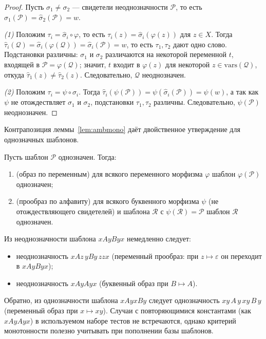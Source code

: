 \documentclass[14pt, russian]{scrartcl}
\begin{document}
\begin{proof}
Пусть $\sigma_1 \neq \sigma_2$ --- свидетели неоднозначности $\mathcal{P}$, то есть
$\hat\sigma_1(\mathcal{P}) = \hat\sigma_2(\mathcal{P}) = w$.

\textit{(1)} Положим $\tau_i = \hat\sigma_i \circ \varphi$, то есть
$\tau_i(z) = \hat\sigma_i(\varphi(z))$ для $z \in X$. Тогда
$\hat\tau_i(\mathcal{Q}) = \hat\sigma_i(\varphi(\mathcal{Q})) =
\hat\sigma_i(\mathcal{P}) = w$, то есть $\tau_1, \tau_2$ дают одно слово.
Подстановки различны: $\sigma_1$ и $\sigma_2$ различаются на некоторой переменной
$t$, входящей в $\mathcal{P} = \varphi(\mathcal{Q})$; значит, $t$ входит в
$\varphi(z)$ для некоторой $z \in \mathrm{vars}(\mathcal{Q})$, откуда
$\hat\tau_1(z) \neq \hat\tau_2(z)$. Следовательно, $\mathcal{Q}$ неоднозначен.

\textit{(2)} Положим $\tau_i = \psi \circ \sigma_i$. Тогда
$\hat\tau_i(\psi(\mathcal{P})) = \psi(\hat\sigma_i(\mathcal{P})) = \psi(w)$, а так
как $\psi$ не отождествляет $\sigma_1$ и $\sigma_2$, подстановки $\tau_1, \tau_2$
различны. Следовательно, $\psi(\mathcal{P})$ неоднозначен.
\end{proof}

Контрапозиция леммы~\ref{lem:ambmono} даёт двойственное утверждение для
однозначных шаблонов.

\begin{Consequent}
\label{cor:unambmono}
Пусть шаблон $\mathcal{P}$ однозначен. Тогда:
\begin{enumerate}
\item (образ по переменным) для всякого переменного морфизма $\varphi$ шаблон
  $\varphi(\mathcal{P})$ однозначен;
\item (прообраз по алфавиту) для всякого буквенного морфизма $\psi$ (не
  отождествляющего свидетелей) и шаблона $\mathcal{R}$ с
  $\psi(\mathcal{R}) = \mathcal{P}$ шаблон $\mathcal{R}$ однозначен.
\end{enumerate}
\end{Consequent}

\begin{Example}
Из неоднозначности шаблона $x A y B y x$ немедленно следует:
\begin{itemize}
\item неоднозначность $x A z\, y B y\, z z x$ (переменный прообраз: при $z \mapsto
  \varepsilon$ он переходит в $x A y B y x$);
\item неоднозначность $x A y A y x$ (буквенный образ при $B \mapsto A$).
\end{itemize}
Обратно, из однозначности шаблона $x A y x B y$ следует однозначность
$x y\, A\, y\, x y\, B\, y$ (переменный образ при $x \mapsto x y$). Случаи с
повторяющимися константами (как $x A y A y x$) в используемом наборе тестов не
встречаются, однако критерий монотонности полезно учитывать при пополнении базы
шаблонов.
\end{Example}
\end{document}
